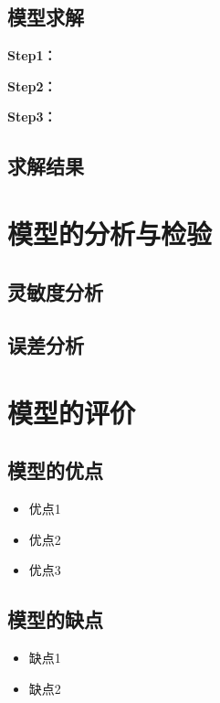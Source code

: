 \documentclass[withoutpreface,bwprint]{cumcmthesis}
\begin{document}
\subsection{模型求解}

\textbf{Step1：} 

\textbf{Step2：} 

\textbf{Step3：} 

\subsection{求解结果}


\section{模型的分析与检验}

\subsection{灵敏度分析}

\subsection{误差分析}


\section{模型的评价}

\subsection{模型的优点}
\begin{itemize}[itemindent=2em]
\item 优点1
\item 优点2
\item 优点3
\end{itemize}

\subsection{模型的缺点}
\begin{itemize}[itemindent=2em]
\item 缺点1
\item 缺点2
\end{itemize}
\end{document}
